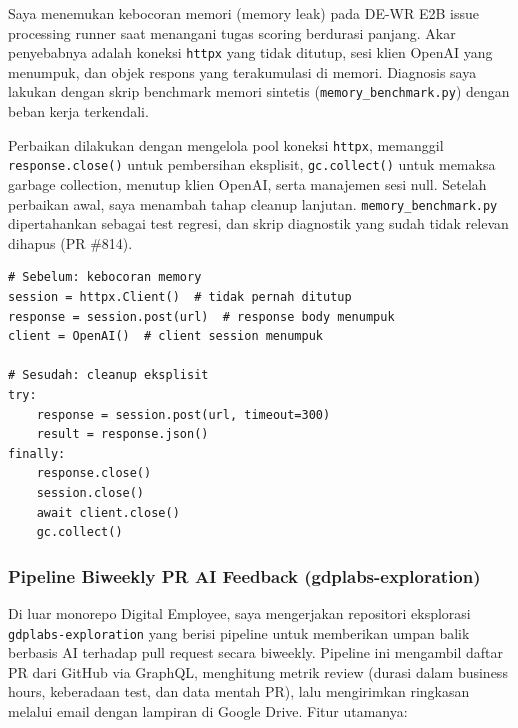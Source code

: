 Saya menemukan kebocoran memori (memory leak) pada DE-WR E2B issue processing runner saat menangani tugas scoring berdurasi panjang. Akar penyebabnya adalah koneksi \texttt{httpx} yang tidak ditutup, sesi klien OpenAI yang menumpuk, dan objek respons yang terakumulasi di memori. Diagnosis saya lakukan dengan skrip benchmark memori sintetis (\texttt{memory\_benchmark.py}) dengan beban kerja terkendali.

Perbaikan dilakukan dengan mengelola pool koneksi \texttt{httpx}, memanggil \texttt{response.close()} untuk pembersihan eksplisit, \texttt{gc.collect()} untuk memaksa garbage collection, menutup klien OpenAI, serta manajemen sesi null. Setelah perbaikan awal, saya menambah tahap cleanup lanjutan. \texttt{memory\_benchmark.py} dipertahankan sebagai test regresi, dan skrip diagnostik yang sudah tidak relevan dihapus (PR \#814).

\begin{lstlisting}[caption={Perbandingan sebelum dan sesudah perbaikan memory leak}]
# Sebelum: kebocoran memory
session = httpx.Client()  # tidak pernah ditutup
response = session.post(url)  # response body menumpuk
client = OpenAI()  # client session menumpuk

# Sesudah: cleanup eksplisit
try:
    response = session.post(url, timeout=300)
    result = response.json()
finally:
    response.close()
    session.close()
    await client.close()
    gc.collect()
\end{lstlisting}

\subsubsection{Pipeline Biweekly PR AI Feedback (gdplabs-exploration)}

Di luar monorepo Digital Employee, saya mengerjakan repositori eksplorasi \texttt{gdplabs-exploration} yang berisi pipeline untuk memberikan umpan balik berbasis AI terhadap pull request secara biweekly. Pipeline ini mengambil daftar PR dari GitHub via GraphQL, menghitung metrik review (durasi dalam business hours, keberadaan test, dan data mentah PR), lalu mengirimkan ringkasan melalui email dengan lampiran di Google Drive. Fitur utamanya:

